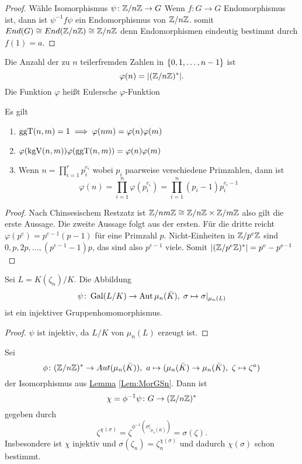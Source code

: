 \begin{proof}
    Wähle Isomorphismus \(\psi\colon \mathbb{Z}/n\mathbb{Z}\to G\) Wenn \(f\colon G\to G\) Endomorphismus ist, dann ist \(\psi^{-1}f\psi\) ein Endomorphismus von \(\mathbb{Z}/n\mathbb{Z}\).
    somit \(End(G)\cong End(\mathbb{Z}/n\mathbb{Z})\cong \mathbb{Z}/n\mathbb{Z}\) denn Endomorphismen eindeutig bestimmt durch \(f(1)=a\).
\end{proof}
\begin{Def}
   Die Anzahl der zu \(n\) teilerfremden Zahlen in \(\{0,1,\dots,n-1\}\) ist \[\varphi(n)=\lvert(\mathbb{Z}/n\mathbb{Z})^*\rvert.\] Die Funktion \(\varphi\) heißt Eulersche \(\varphi\)-Funktion
\end{Def}
\begin{Lemma} Es gilt
    \begin{enumerate}
        \item  \(\operatorname{ggT}(n,m)=1\implies \varphi(nm)=\varphi(n)\varphi(m)\)
        \item \(\varphi(\operatorname{kgV}(n,m))\varphi(\operatorname{ggT}(n,m))=\varphi(n)\varphi(m)\)
        \item Wenn \(n=\prod_{i=1}^rp_i^{e_i}\) wobei \(p_i\) paarweise verschiedene Primzahlen, dann ist 
        \[\varphi(n)=\prod_{i=1}^n\varphi(p_i^{e_i})=\prod_{i=1}^n(p_i-1)p_i^{e_i-1}\]
    \end{enumerate}
\end{Lemma}
\begin{proof}
    Nach Chinsesischem Restzatz ist \(\mathbb{Z}/nm\mathbb{Z}\cong \mathbb{Z}/n\mathbb{Z}\times \mathbb{Z}/m\mathbb{Z}\) also gilt die erste Aussage. Die zweite Aussage folgt aus der ersten.
    Für die dritte reicht \(\varphi(p^e)=p^{e-1}(p-1)\) für eine Primzahl \(p\).
    Nicht-Einheiten in \(\mathbb{Z}/p^e\mathbb{Z}\) sind \(0,p,2p,\dots,(p^{e-1}-1)p\), das sind also \(p^{e-1}\) viele. Somit \(|(\mathbb{Z}/p^e\mathbb{Z})^*|=p^e-p^{e-1}\)
\end{proof}
\begin{Satz}
    Sei \(L=K(\zeta_n)/K\). Die Abbildung 
    \[\psi\colon\operatorname{Gal}(L/K)\to\operatorname{Aut}\mu_n(\bar K),\; \sigma\mapsto \sigma|_{\mu_n(L)}\] ist ein injektiver Gruppenhomomorphismus.
\end{Satz}
\begin{proof}
    \(\psi\) ist injektiv, da \(L/K\) von \(\mu_n(L)\) erzeugt ist.
\end{proof}
\begin{Kor}\label{Kor:ChiGal}
    Sei \[\phi\colon(\ZZ/n\ZZ)^*\to Aut(\mu_n(\bar K)),\ a\mapsto (\mu_n(\bar K)\to\mu_n(\bar K),\ \zeta\mapsto \zeta^a)\] der Isomorphismus aus \hyperref[Lem:MorGSn]{Lemma} \ref{Lem:MorGSn}.
    Dann ist \[\chi=\phi^{-1}\psi\colon G\to (\mathbb{Z}/n\mathbb{Z})^* \] gegeben durch \[\zeta^{\chi(\sigma)}=\zeta^{\phi^{-1}(\sigma|_{\mu_n(\bar K)})}=\sigma(\zeta).\]
    Insbesondere ist \(\chi\) injektiv und \(\sigma(\zeta_n)=\zeta_n^{\chi(\sigma)}\) und dadurch \(\chi(\sigma)\) schon bestimmt.
\end{Kor}
